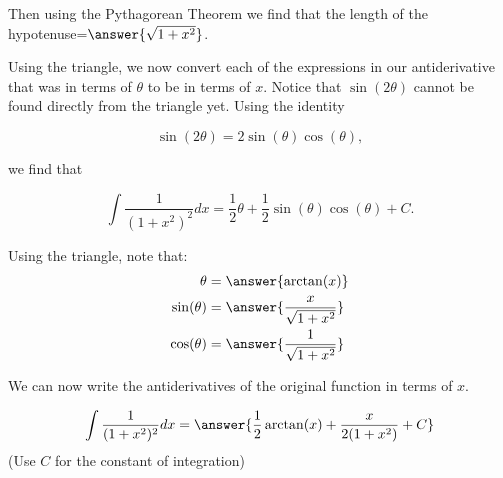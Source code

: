 \documentclass{ximera}
\begin{document}
\begin{exercise}
\begin{exercise}
\begin{exercise}
    \begin{image}
    \end{image}

Then using the Pythagorean Theorem we find that the
 length of the hypotenuse=$\answer{\sqrt{1+x^2}}$. 

Using the triangle, we now convert each of the expressions in our antiderivative that was in terms of $\theta$ to be in terms of $x$.  Notice that $\sin(2 \theta)$ cannot be found directly from the triangle yet.  Using the identity

\[
\sin(2\theta)=2\sin(\theta)\cos(\theta),
\]

we find that 

\[ \int \frac{1}{ (1+x^2)^2} dx = \frac{1}{2}\theta + \frac{1}{2} \sin(\theta) \cos(\theta) + C.\]  

Using the triangle, note that: 
\begin{align}
\theta&=\answer{\arctan(x)} \\
\sin(\theta)&=\answer{\frac{x}{\sqrt{1+x^{2}}}} \\
 \cos(\theta)&=\answer{\frac{1}{\sqrt{1+x^{2}}}} 
\end{align}

We can now write the antiderivatives of the original function in terms of $x$.

\[
\int \frac{1}{ (1+x^2)^2} dx= \answer{ \frac{1}{2}\arctan(x) + \frac{x}{2(1+x^{2})} + C }
\]
(Use $C$ for the constant of integration)

\end{exercise}

\end{exercise}

\end{exercise}
\end{document}
